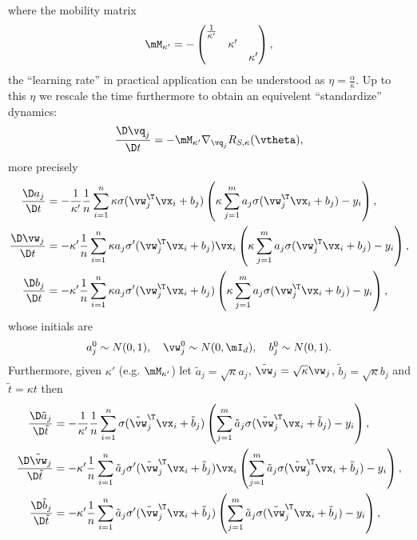 \documentclass{article}
\begin{document}
where the mobility matrix
\begin{equation}
    \mM_{\kappa'} = -
    \begin{pmatrix}
        \frac{1}{\kappa'} &         &         \\
                          & \kappa' &         \\
                          &         & \kappa'
    \end{pmatrix},
\end{equation}
the ``learning rate'' in practical application can be understood as $\eta = \frac{\alpha}{\kappa}$. Up to this $\eta$ we rescale the time furthermore to obtain an equivelent ``standardize'' dynamics:
\begin{equation}
    \frac{\D \vq_j}{\D t} = -\mM_{\kappa'}\nabla_{\vq_j}R_{S, \kappa}(\vtheta),
\end{equation}
more precisely
\begin{align*}
    \frac{\D a_j}{\D t}
     & = -\frac{1}{\kappa'}\frac{1}{n}\sum_{i=1}^n \kappa\sigma(\vw_j^\T\vx_i+b_j) \left(\kappa\sum_{j=1}^{m}a_j\sigma(\vw_j^\T\vx_i+b_j)-y_i\right), \\
    \frac{\D \vw_j}{\D t}
     & = -\kappa'\frac{1}{n}\sum_{i=1}^n\kappa a_j\sigma'(\vw_j^\T\vx_i+b_j)\vx_i \left(\kappa\sum_{j=1}^{m}a_j\sigma(\vw_j^\T\vx_i+b_j)-y_i\right),  \\
    \frac{\D b_j}{\D t}
     & = -\kappa'\frac{1}{n}\sum_{i=1}^n\kappa a_j\sigma'(\vw_j^\T\vx_i+b_j) \left(\kappa\sum_{j=1}^{m}a_j\sigma(\vw_j^\T\vx_i+b_j)-y_i\right),
\end{align*}
whose initials are
\begin{equation}
    a_j^0\sim N(0,1), \quad \vw_j^0\sim N(0,\mI_d), \quad b_j^0\sim N(0, 1).
\end{equation}
Furthermore, given $\kappa'$ (e.g. $\mM_{\kappa'}$) let $\tilde{a}_j = \sqrt{\kappa}a_j$, $\tilde{\vw}_j = \sqrt{\kappa}\vw_j$, $\tilde{b}_j=\sqrt{\kappa}b_j$ and $\tilde{t}=\kappa t$ then
\begin{align*}
    \frac{\D \tilde{a}_j}{\D \tilde{t}}
     & = -\frac{1}{\kappa'}\frac{1}{n}\sum_{i=1}^n\sigma(\tilde{\vw}_j^\T\vx_i+\tilde{b}_j) \left(\sum_{j=1}^{m}\tilde{a}_j\sigma(\tilde{\vw}_j^\T\vx_i+\tilde{b}_j)-y_i\right),        \\
    \frac{\D \tilde{\vw}_j}{\D \tilde{t}}
     & = -\kappa'\frac{1}{n}\sum_{i=1}^n\tilde{a}_j\sigma'(\tilde{\vw}_j^\T\vx_i+\tilde{b}_j)\vx_i \left(\sum_{j=1}^{m}\tilde{a}_j\sigma(\tilde{\vw}_j^\T\vx_i+\tilde{b}_j)-y_i\right), \\
    \frac{\D \tilde{b}_j}{\D \tilde{t}}
     & = -\kappa'\frac{1}{n}\sum_{i=1}^n\tilde{a}_j\sigma'(\tilde{\vw}_j^\T\vx_i+\tilde{b}_j) \left(\sum_{j=1}^{m}\tilde{a}_j\sigma(\tilde{\vw}_j^\T\vx_i+\tilde{b}_j)-y_i\right),
\end{align*}
\end{document}
